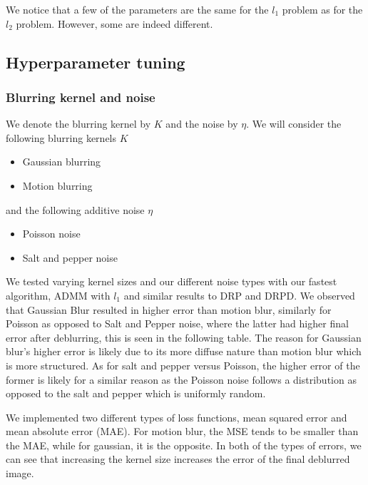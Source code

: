 \documentclass{article}
\theoremstyle{definition}
\theoremstyle{remark}
\begin{document}
We notice that a few of the parameters are the same for the $l_1$ problem as for the $l_2$ problem. However, some are indeed different.





\subsection{Hyperparameter tuning}
\label{hyperTuning}
\subsubsection*{Blurring kernel and noise}
We denote the blurring kernel by $K$ and the noise by $\eta$. We will consider the following blurring kernels $K$

\begin{itemize}
    \item Gaussian blurring
    \item Motion blurring
\end{itemize}

and the following additive noise $\eta$

\begin{itemize}
    \item Poisson noise
    \item Salt and pepper noise
\end{itemize}

We tested varying kernel sizes and our different noise types with our fastest algorithm, ADMM with $l_1$ and similar results to DRP and DRPD. We observed that Gaussian Blur resulted in higher error than motion blur, similarly for Poisson as opposed to Salt and Pepper noise, where the latter had higher final error after deblurring, this is seen in the following table. The reason for Gaussian blur's higher error is likely due to its more diffuse nature than motion blur which is more structured. As for salt and pepper versus Poisson, the higher error of the former is likely for a similar reason as the Poisson noise follows a distribution as opposed to the salt and pepper which is uniformly random. 

We implemented two different types of loss functions, mean squared error and mean absolute error (MAE). For motion blur, the MSE tends to be smaller than the MAE, while for gaussian, it is the opposite. In both of the types of errors, we can see that increasing the kernel size increases the error of the final deblurred image.
\end{document}
